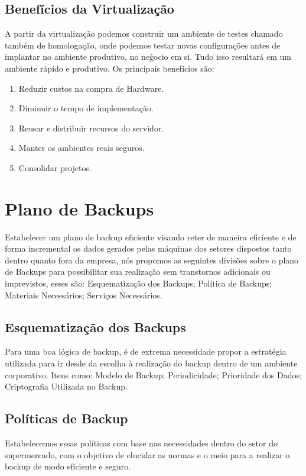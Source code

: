 \documentclass[12pt]{article}
\begin{document}
\subsection{Benefícios da Virtualização}
A partir da virtualização podemos construir um ambiente de testes chamado também de homologação, onde podemos testar novas configurações antes de implantar no ambiente produtivo, no neǵocio em si. Tudo isso resultará em um ambiente rápido e produtivo. Os principais benefícios são:

\begin{enumerate}
    \item Reduzir custos na compra de Hardware.
    \item Diminuir o tempo de implementação.
    \item Reusar e distribuir recursos do servidor.
    \item Manter os ambientes reais seguros.
    \item Consolidar projetos.
\end{enumerate}

\section{Plano de Backups}
Estabelecer um plano de backup eficiente visando reter de maneira eficiente e de forma incremental os dados gerados pelas máquinas dos setores dispostos tanto dentro quanto fora da empresa, nós propomos as seguintes divisões sobre o plano de Backups para possibilitar sua realização sem transtornos adicionais ou imprevistos, esses são: Esquematização dos Backups; Política de Backups; Materiais Necessários; Serviços Necessários.

\subsection{Esquematização dos Backups}
Para uma boa lógica de backup, é de extrema necessidade propor a estratégia utilizada para ir desde da escolha à realização do backup dentro de um ambiente corporativo. Itens como: Modelo de Backup; Periodicidade; Prioridade dos Dados; Criptografia Utilizada no Backup.

\subsection{Políticas de Backup}
Estabelecemos essas políticas com base nas necessidades dentro do setor do supermercado, com o objetivo de elucidar as normas e o meio para a realizar o backup de modo eficiente e seguro.
\end{document}
